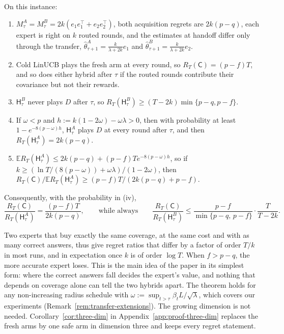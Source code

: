 \documentclass[anon]{alt2027} %
\newif\ifrevmarks\revmarkstrue
\newenvironment{revised}{\ifrevmarks\color{revcolor}\fi}{}
\newcommand{\E}{\mathbb{E}}
\newcommand{\Cold}{\mathsf{C}}
\newcommand{\Hyb}{\mathsf{H}}
\begin{document}
\begin{theorem}
\label{thm:transfer-separation}
On this instance:
\begin{enumerate}[itemsep=1pt,topsep=1pt,leftmargin=*]
\item[(i)] $M_\tau^{A}=M_\tau^{B}=2k(e_1e_1^\top+e_2e_2^\top)$, both acquisition
regrets are $2k(p-q)$, each expert is right on $k$ routed rounds, and the
estimates at handoff differ only through the transfer,
$\widehat\theta^{A}_{\tau+1}=\frac{k}{\lambda+2k}e_1$ and
$\widehat\theta^{B}_{\tau+1}=\frac{k}{\lambda+2k}e_2$.
\item[(ii)] Cold LinUCB plays the fresh arm at every round, so
$R_T(\Cold)=(p-f)T$, and so does either hybrid after $\tau$ if the routed
rounds contribute their covariance but not their rewards.
\item[(iii)] $\Hyb^{B}_\tau$ never plays $D$ after $\tau$, so
$R_T(\Hyb^{B}_\tau)\ge(T-2k)\min\{p-q,p-f\}$.
\item[(iv)] If $\omega<p$ and $h:=k(1-2\omega)-\omega\lambda>0$, then with
probability at least $1-e^{-8(p-\omega)h}$, $\Hyb^{A}_\tau$ plays $D$ at every
round after $\tau$, and then $R_T(\Hyb^{A}_\tau)=2k(p-q)$.
\item[(v)] $\E R_T(\Hyb^{A}_\tau)\le2k(p-q)+(p-f)Te^{-8(p-\omega)h}$, so if
$k\ge(\ln T/(8(p-\omega))+\omega\lambda)/(1-2\omega)$, then
$R_T(\Cold)/\E R_T(\Hyb^{A}_\tau)\ge(p-f)T/(2k(p-q)+p-f)$.
\end{enumerate}
Consequently, with the probability in (iv),
\[
\frac{R_T(\Cold)}{R_T(\Hyb^{A}_\tau)}=\frac{(p-f)T}{2k(p-q)},
\qquad\text{while always}\qquad
\frac{R_T(\Cold)}{R_T(\Hyb^{B}_\tau)}\le\frac{p-f}{\min\{p-q,\,p-f\}}\cdot\frac{T}{T-2k}.
\]
\end{theorem}

\begin{revised}
Two experts that buy exactly the same coverage, at the same cost and with as
many correct answers, thus give regret ratios that differ by a factor of
order $T/k$ in most runs, and in expectation once $k$ is of order $\log T$.
When $f>p-q$, the more accurate expert loses. This is the main idea of the
paper in its simplest form: where the correct answers fall decides the
expert's value, and nothing that depends on coverage alone can tell the two
hybrids apart. The theorem holds for any non-increasing radius schedule with
$\omega:=\sup_{t>\tau}\beta_tL/\sqrt\lambda$, which covers our experiments
(Remark~\ref{rem:transfer-extensions}). The growing dimension is not needed.
Corollary~\ref{cor:three-dim} in Appendix~\ref{app:proof-three-dim}
replaces the fresh arms by one safe arm in dimension three and keeps every
regret statement.
\end{revised}
\end{document}
